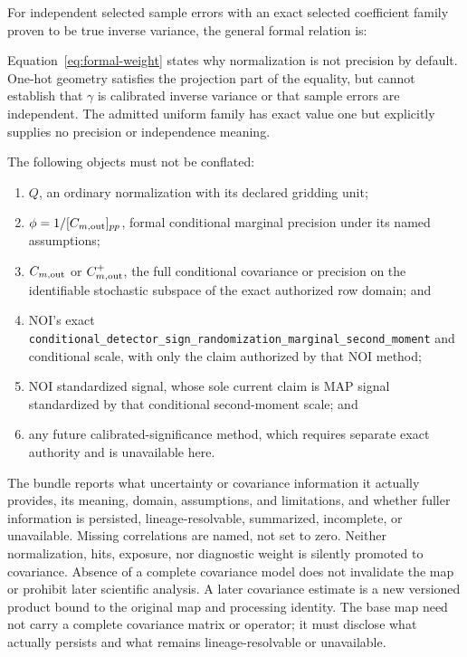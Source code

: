 \documentclass[10pt]{article}
\newcommand{\code}[1]{\nolinkurl{#1}}
\begin{document}
For independent selected sample errors with an exact selected coefficient
family proven to be true inverse variance, the general formal relation is:

\SCIMapFormalWeightEquations

Equation~\eqref{eq:formal-weight} states why normalization is not precision by
default. One-hot geometry satisfies the projection part of the equality, but
cannot establish that \(\gamma\) is calibrated inverse variance or that sample
errors are independent. The admitted uniform family has exact value one but
explicitly supplies no precision or independence meaning.

The following objects must not be conflated:

\begin{enumerate}
\item \(Q\), an ordinary normalization with its declared gridding unit;
\item \(\phi=1/[C_{m,{\rm out}}]_{pp}\), formal conditional marginal
precision under its named assumptions;
\item \(C_{m,{\rm out}}\) or \(C_{m,{\rm out}}^+\), the full conditional
covariance or precision on the identifiable stochastic subspace of the exact
authorized row domain; and
\item NOI's exact
\code{conditional_detector_sign_randomization_marginal_second_moment} and
conditional scale, with only the claim authorized by that NOI method;
\item NOI standardized signal, whose sole current claim is MAP signal
standardized by that conditional second-moment scale; and
\item any future calibrated-significance method, which requires separate
exact authority and is unavailable here.
\end{enumerate}

\SCIMapNOIOwnershipStatement

The bundle reports what uncertainty or covariance information it actually
provides, its meaning, domain, assumptions, and limitations, and whether fuller
information is persisted, lineage-resolvable, summarized, incomplete, or
unavailable. Missing correlations are named, not set to zero. Neither
normalization, hits, exposure, nor diagnostic weight is silently promoted to
covariance. Absence of a complete covariance model does not invalidate the map
or prohibit later scientific analysis. A later covariance estimate is a new
versioned product bound to the original map and processing identity. The base
map need not carry a complete covariance matrix or operator; it must disclose
what actually persists and what remains lineage-resolvable or unavailable.
\end{document}
